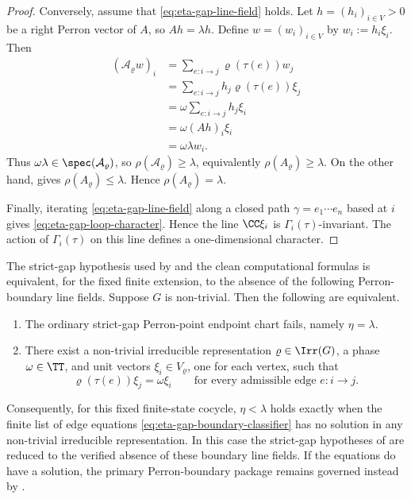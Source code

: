 \begin{proof}
  Conversely, assume that \eqref{eq:eta-gap-line-field} holds. Let
  \(h=(h_i)_{i\in V}>0\) be a right Perron vector of \(A\), so
  \(Ah=\lambda h\). Define \(w=(w_i)_{i\in V}\) by
  \(w_i:=h_i\xi_i\). Then
  \begin{align*}
    (\mathcal A_\varrho w)_i
    &=
    \sum_{e:i\to j}\varrho(\tau(e))w_j \\
    &=
    \sum_{e:i\to j}h_j\varrho(\tau(e))\xi_j \\
    &=
    \omega\sum_{e:i\to j}h_j\xi_i \\
    &=
    \omega(Ah)_i\xi_i \\
    &=
    \omega\lambda w_i.
  \end{align*}
  Thus \(\omega\lambda\in\spec(\mathcal A_\varrho)\), so
  \(\rho(\mathcal A_\varrho)\ge \lambda\), equivalently
  \(\rho(A_\varrho)\ge \lambda\). On the other hand,
   gives
  \(\rho(A_\varrho)\le \lambda\). Hence
  \(\rho(A_\varrho)=\lambda\).

  Finally, iterating \eqref{eq:eta-gap-line-field} along a closed path
  \(\gamma=e_1\cdots e_n\) based at \(i\) gives
  \eqref{eq:eta-gap-loop-character}. Hence the line \(\CC\xi_i\) is
  \(\Gamma_i(\tau)\)-invariant. The action of \(\Gamma_i(\tau)\) on
  this line defines a one-dimensional character.
\end{proof}

\begin{corollary}
  \label{cor:eta-gap-boundary-classifier}
  The strict-gap hypothesis used by  and the clean computational formulas is equivalent, for
  the fixed finite extension, to the absence of the following Perron-boundary
  line fields.
  Suppose \(G\) is non-trivial. Then the following are equivalent.
  \begin{enumerate}
    \item The ordinary strict-gap Perron-point endpoint chart fails,
      namely \(\eta=\lambda\).
    \item There exist a non-trivial irreducible representation
      \(\varrho\in\Irr(G)\), a phase \(\omega\in\TT\), and unit vectors
      \(\xi_i\in V_\varrho\), one for each vertex, such that
      \begin{equation}\label{eq:eta-gap-boundary-classifier}
        \varrho(\tau(e))\xi_j=\omega\xi_i
        \qquad
        \text{for every admissible edge } e:i\to j.
      \end{equation}
  \end{enumerate}
  Consequently, for this fixed finite-state cocycle, \(\eta<\lambda\) holds
  exactly when the finite list of edge equations
  \eqref{eq:eta-gap-boundary-classifier} has no solution in any non-trivial
  irreducible representation. In this case the strict-gap hypotheses of
   are reduced to the verified absence
  of these boundary line fields.  If the equations do have a solution, the
  primary Perron-boundary package remains governed instead by
  .
\end{corollary}

